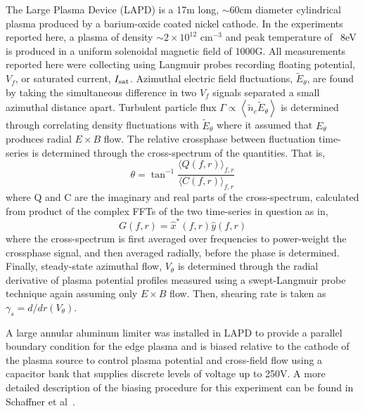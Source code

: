\documentclass[aip,pop,amsmath,amssymb,preprint,superscriptaddress]{revtex4-1} %
\begin{document}
The Large Plasma Device \cite{gek91} (LAPD) is a 17m long, $\sim$60cm diameter cylindrical plasma produced by a barium-oxide coated nickel cathode. In the experiments reported here, a plasma of density $\sim$$2 \times 10^{12}$ cm$^{-3}$ and peak temperature of ~8eV is produced in a uniform solenoidal magnetic field of 1000G. All measurements reported here were collecting using Langmuir probes recording floating potential, $V_{f}$, or saturated current, $I_{\rm sat}$. Azimuthal electric field fluctuations, $\tilde{E}_{\theta}$, are found by taking the simultaneous difference in two $V_{f}$ signals separated a small azimuthal distance apart. Turbulent particle flux $\Gamma \propto \left<\tilde{n}_e \tilde{E}_\theta\right>$ is determined through correlating density fluctuations with $\tilde{E}_{\theta}$ where it assumed that $E_{\theta}$ produces radial $E \times B$ flow. The relative crossphase between fluctuation time-series is determined through the cross-spectrum of the quantities. That is,
%
\begin{equation}
\theta = \tan^{-1}\frac{\langle Q(f,r)\rangle_{f,r}}{\langle C(f,r)\rangle_{f,r}}
\label{eq:crossphase}
\end{equation}
%
where Q and C are the imaginary and real parts of the cross-spectrum, calculated from product of the complex FFTs of the two time-series in question as in,
\begin{equation}
G(f,r) = \hat{x}^{\ast}(f,r)\hat{y}(f,r)
\label{eq:crossspectrum}
\end{equation}
%
where the cross-spectrum is first averaged over frequencies to power-weight the crossphase signal, and then averaged radially, before the phase is determined. Finally, steady-state azimuthal flow, $V_{\theta}$ is determined through the radial derivative of plasma potential profiles measured using a swept-Langmuir probe technique again assuming only $E \times B$ flow. Then, shearing rate is taken as $\gamma_{s} = d/dr(V_{\theta})$.

A large annular aluminum limiter was installed in LAPD to provide a parallel boundary condition for the edge plasma and is biased relative to the cathode of the plasma source to control plasma potential and cross-field flow using a capacitor bank that supplies discrete levels of voltage up to 250V. A more detailed description of the biasing procedure for this experiment can be found in Schaffner et al~\cite{schaffner12}.
\end{document}
